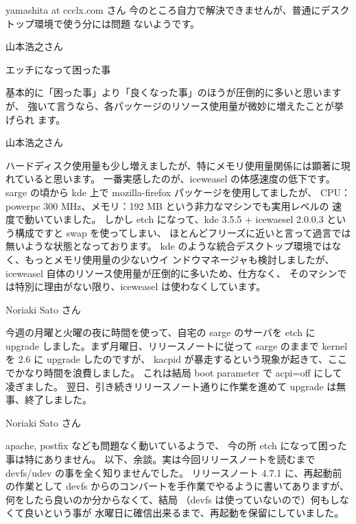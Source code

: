 \documentclass[cjk,dvipdfmx,12pt]{beamer}
\begin{document}
\begin{frame}[containsverbatim]{yamashita at ccclx.com さん}
今のところ自力で解決できませんが、普通にデスクトップ環境で使う分には問題 
ないようです。

\end{frame}\begin{frame}{山本浩之さん}

エッチになって困った事

基本的に「困った事」より「良くなった事」のほうが圧倒的に多いと思いますが、
強いて言うなら、各パッケージのリソース使用量が微妙に増えたことが挙げられ
ます。

\end{frame}\begin{frame}{山本浩之さん}

ハードディスク使用量も少し増えましたが、特にメモリ使用量関係には顕著に現
れていると思います。
一番実感したのが、iceweasel の体感速度の低下です。
sarge の頃から kde 上で mozilla-firefox パッケージを使用してましたが、
CPU：powerpc 300 MHz、メモリ：192 MB という非力なマシンでも実用レベルの
速度で動いていました。
しかし etch になって、kde 3.5.5 + icewaesel 2.0.0.3 という構成ですと
swap を使ってしまい、
ほとんどフリーズに近いと言って過言では無いような状態となっております。
kde のような統合デスクトップ環境ではなく、もっとメモリ使用量の少ないウイ
ンドウマネージャも検討しましたが、
iceweasel 自体のリソース使用量が圧倒的に多いため、仕方なく、
そのマシンでは特別に理由がない限り、iceweasel は使わなくしています。

\end{frame}\begin{frame}{Noriaki Sato さん}


今週の月曜と火曜の夜に時間を使って、自宅の sarge のサーバを
etch に upgrade しました。まず月曜日、リリースノートに従って
sarge のままで kernel を 2.6 に upgrade したのですが、
kacpid が暴走するという現象が起きて、ここでかなり時間を浪費しました。
これは結局 boot parameter で acpi=off にして凌ぎました。
翌日、引き続きリリースノート通りに作業を進めて
upgrade は無事、終了しました。

\end{frame}\begin{frame}{Noriaki Sato さん}

apache, postfix なども問題なく動いているようで、
今の所 etch になって困った事は特にありません。
以下、余談。実は今回リリースノートを読むまで
devfs/udev の事を全く知りませんでした。
リリースノート 4.7.1 に、再起動前の作業として
devfs からのコンバートを手作業でやるように書いてありますが、
何をしたら良いのか分からなくて、結局
（devfs は使っていないので）何もしなくて良いという事が
水曜日に確信出来るまで、再起動を保留にしていました。


\end{frame}
\end{document}

